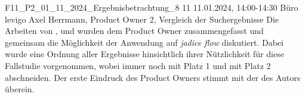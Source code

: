 \fieldnote
{F11\_P2\_01\_11\_2024\_Ergebnisbetrachtung\_8}
{11}
{11.01.2024, 14:00-14:30}
{Büro levigo}
{Axel Herrmann, Product Owner}
{2, Vergleich der Suchergebnisse}
{
  Die Arbeiten von ,  und  wurden dem Product Owner zusammengefasst und gemeinsam die Möglichkeit der Anwendung auf \emph{jadice flow} diskutiert.
  Dabei wurde eine Ordnung aller Ergebnisse hinsichtlich ihrer Nützlichkeit für diese Fallstudie vorgenommen, wobei immer noch  mit Platz 1 und  mit Platz 2 abschneiden.
}
{
}
{
}
{}
{
  Der erste Eindruck des Product Owners stimmt mit der des Autors überein.
}
